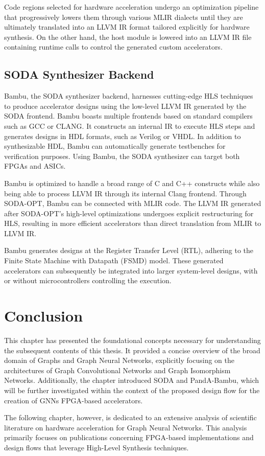  Code regions selected for hardware acceleration undergo an optimization pipeline that progressively lowers them through various MLIR dialects until they are ultimately translated into an LLVM IR format tailored explicitly for hardware synthesis.
On the other hand, the host module is lowered into an LLVM IR file containing runtime calls to control the generated custom accelerators.

\subsection{SODA Synthesizer Backend}
\label{subsec:soda_backend}%

Bambu, the SODA synthesizer backend, harnesses cutting-edge HLS techniques to produce accelerator designs using the low-level LLVM IR generated by the SODA frontend.
Bambu boasts multiple frontends based on standard compilers such as GCC or CLANG.
It constructs an internal IR to execute HLS steps and generates designs in HDL formats, such as Verilog or VHDL.
In addition to synthesizable HDL, Bambu can automatically generate testbenches for verification purposes.
Using Bambu, the SODA synthesizer can target both FPGAs and ASICs.

Bambu is optimized to handle a broad range of C and C++ constructs while also being able to process LLVM IR through its internal Clang frontend.
Through SODA-OPT, Bambu can be connected with MLIR code.
The LLVM IR generated after SODA-OPT's high-level optimizations undergoes explicit restructuring for HLS, resulting in more efficient accelerators than direct translation from MLIR to LLVM IR.

Bambu generates designs at the Register Transfer Level (RTL), adhering to the Finite State Machine with Datapath (FSMD) model.
These generated accelerators can subsequently be integrated into larger system-level designs, with or without microcontrollers controlling the execution.

\section{Conclusion}
\label{sec:background_conclusion}
This chapter has presented the foundational concepts necessary for understanding the subsequent contents of this thesis.
It provided a concise overview of the broad domain of Graphs and Graph Neural Networks, explicitly focusing on the architectures of Graph Convolutional Networks and Graph Isomorphism Networks.
Additionally, the chapter introduced SODA and PandA-Bambu, which will be further investigated within the context of the proposed design flow for the creation of GNNs FPGA-based accelerators.

The following chapter, however, is dedicated to an extensive analysis of scientific literature on hardware acceleration for Graph Neural Networks.
This analysis primarily focuses on publications concerning FPGA-based implementations and design flows that leverage High-Level Synthesis techniques.
